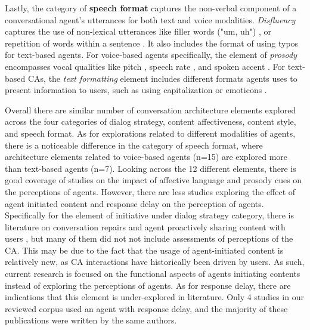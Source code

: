 Lastly, the category of \textbf{speech format} captures the non-verbal component of a conversational agent's utterances for both text and voice modalities. \textit{Disfluency} captures 
the use of non-lexical utterances like filler words ("um, uh") \cite{hu2021enhancing, jeong2019exploring}\cmt{[56][10]}, or repetition of words within a sentence \cite{yang2021effect}\cmt{[72]}. It also includes the format of using typos \cite{westerman2019believe}\cmt{[9]} for text-based agents. For voice-based agents specifically, the element of \textit{prosody} encompasses vocal qualities like pitch \cite{habler2019effects, jestin2022effects}\cmt{[63][81]}, speech rate \cite{choi2020nobody}\cmt{[54]}, and spoken accent \cite{feijoo2021effects}\cmt{[70]}. For text-based CAs, the \textit{text formatting} element includes different formats agents uses to present information to users, such as using capitalization \cite{westerman2019believe}\cmt{[9]} or emoticons \cite{kim2019comparing, wilhelm2022keep}\cmt{[89][28]}. 

Overall there are similar number of conversation architecture elements explored across the four categories of dialog strategy, content affectiveness, content style, and speech format. As for explorations related to different modalities of agents, there is a noticeable difference in the category of speech format, where architecture elements related to voice-based agents (n=15) are explored more than text-based agents (n=7). Looking across the 12 different elements, there is good coverage of studies on the impact of affective language and prosody cues on the perceptions of agents. However, there are less studies exploring the effect of agent initiated content and response delay on the perception of agents. Specifically for the element of initiative under dialog strategy category, there is literature on conversation repairs \cite{komatani2010online, reinkemeier2022repair} and agent proactively sharing content with users \cite{dubiel2019inquisitive, zargham2022understanding}, but many of them did not not include assessments of perceptions of the CA. This may be due to the fact that the usage of agent-initiated content is relatively new, as CA interactions have historically been driven by users. As such, current research is focused on the functional aspects of agents initiating contents instead of exploring the perceptions of agents. As for response delay, there are indications that this element is under-explored in literature. Only 4 studies in our reviewed corpus used an agent with response delay, and the majority of these publications were written by the same authors.


